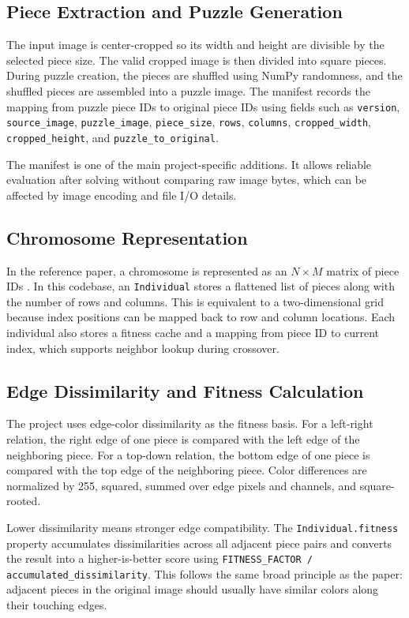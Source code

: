\documentclass[12pt,a4paper]{article}
\begin{document}
\subsection{Piece Extraction and Puzzle Generation}
The input image is center-cropped so its width and height are divisible by the selected piece size. The valid cropped image is then divided into square pieces. During puzzle creation, the pieces are shuffled using NumPy randomness, and the shuffled pieces are assembled into a puzzle image. The manifest records the mapping from puzzle piece IDs to original piece IDs using fields such as \texttt{version}, \texttt{source\_image}, \texttt{puzzle\_image}, \texttt{piece\_size}, \texttt{rows}, \texttt{columns}, \texttt{cropped\_width}, \texttt{cropped\_height}, and \texttt{puzzle\_to\_original}.

The manifest is one of the main project-specific additions. It allows reliable evaluation after solving without comparing raw image bytes, which can be affected by image encoding and file I/O details.

\subsection{Chromosome Representation}
In the reference paper, a chromosome is represented as an \(N \times M\) matrix of piece IDs \cite{sholomon2016automatic}. In this codebase, an \texttt{Individual} stores a flattened list of pieces along with the number of rows and columns. This is equivalent to a two-dimensional grid because index positions can be mapped back to row and column locations. Each individual also stores a fitness cache and a mapping from piece ID to current index, which supports neighbor lookup during crossover.

\subsection{Edge Dissimilarity and Fitness Calculation}
The project uses edge-color dissimilarity as the fitness basis. For a left-right relation, the right edge of one piece is compared with the left edge of the neighboring piece. For a top-down relation, the bottom edge of one piece is compared with the top edge of the neighboring piece. Color differences are normalized by 255, squared, summed over edge pixels and channels, and square-rooted.

Lower dissimilarity means stronger edge compatibility. The \texttt{Individual.fitness} property accumulates dissimilarities across all adjacent piece pairs and converts the result into a higher-is-better score using \texttt{FITNESS\_FACTOR / accumulated\_dissimilarity}. This follows the same broad principle as the paper: adjacent pieces in the original image should usually have similar colors along their touching edges.
\end{document}
